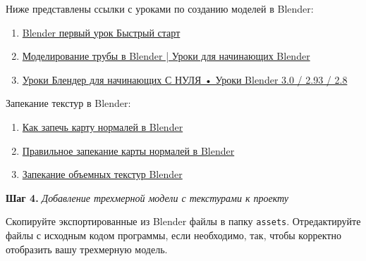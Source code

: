 \documentclass[a4paper,12pt]{article}
\begin{document}
    Ниже представлены ссылки с уроками по созданию моделей в Blender:
    \begin{enumerate}
        \item \href{https://www.youtube.com/watch?v=Y0ayZ1dx78Y}{Blender первый урок Быстрый старт}
        \item \href{https://www.youtube.com/watch?v=OoCGosEVbm0}{Моделирование трубы в Blender | Уроки для начинающих Blender}
        \item \href{https://www.youtube.com/watch?v=vcRe0l-X4ko}{Уроки Блендер для начинающих С НУЛЯ • Уроки Blender 3.0 / 2.93 / 2.8}
    \end{enumerate}
    
    Запекание текстур в Blender:
    \begin{enumerate}
        \item \href{https://youtu.be/YdLn_1Ec5Ws?si=3fVnNwWOcMFaDFmp}{Как запечь карту нормалей в Blender}
        \item \href{https://www.youtube.com/watch?v=6f3Xdy_q7Bs}{Правильное запекание карты нормалей в Blender}
        \item \href{https://www.youtube.com/watch?v=R0KfJwV72dQ}{Запекание объемных текстур Blender}
    \end{enumerate}
    
    \textbf{Шаг 4.} \textit{Добавление трехмерной модели с текстурами к проекту}
    
    Скопируйте экспортированные из Blender файлы в папку \texttt{assets}. Отредактируйте файлы с исходным кодом программы, если необходимо, так, чтобы корректно отобразить вашу трехмерную модель.

    
\end{document}
